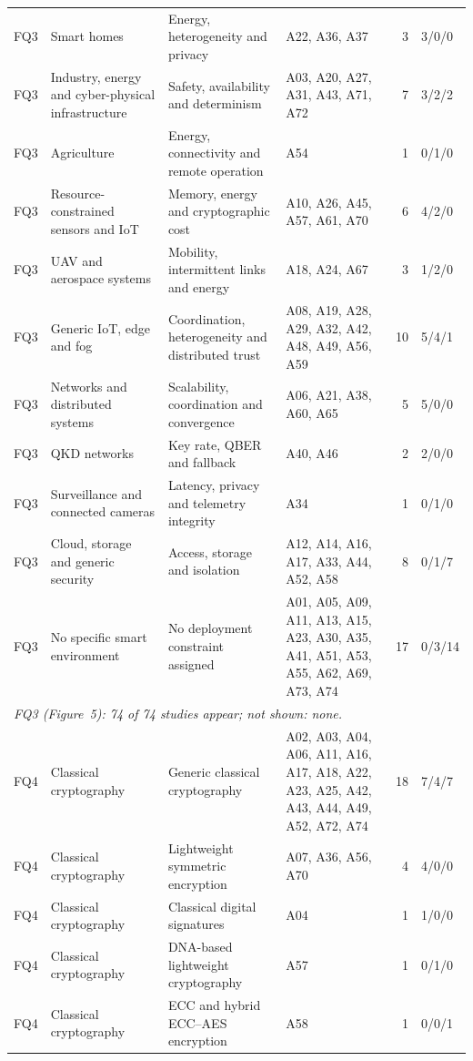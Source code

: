 {\begin{footnotesize}
\begin{longtable}{p{0.63cm}p{2.83cm}p{2.67cm}p{5.19cm}rp{1.26cm}}
FQ3 & Smart homes & Energy, heterogeneity and privacy & A22, A36, A37 & 3 & 3/0/0 \\
FQ3 & Industry, energy and cyber-physical infrastructure & Safety, availability and determinism & A03, A20, A27, A31, A43, A71, A72 & 7 & 3/2/2 \\
FQ3 & Agriculture & Energy, connectivity and remote operation & A54 & 1 & 0/1/0 \\
FQ3 & Resource-constrained sensors and IoT & Memory, energy and cryptographic cost & A10, A26, A45, A57, A61, A70 & 6 & 4/2/0 \\
FQ3 & UAV and aerospace systems & Mobility, intermittent links and energy & A18, A24, A67 & 3 & 1/2/0 \\
FQ3 & Generic IoT, edge and fog & Coordination, heterogeneity and distributed trust & A08, A19, A28, A29, A32, A42, A48, A49, A56, A59 & 10 & 5/4/1 \\
FQ3 & Networks and distributed systems & Scalability, coordination and convergence & A06, A21, A38, A60, A65 & 5 & 5/0/0 \\
FQ3 & QKD networks & Key rate, QBER and fallback & A40, A46 & 2 & 2/0/0 \\
FQ3 & Surveillance and connected cameras & Latency, privacy and telemetry integrity & A34 & 1 & 0/1/0 \\
FQ3 & Cloud, storage and generic security & Access, storage and isolation & A12, A14, A16, A17, A33, A44, A52, A58 & 8 & 0/1/7 \\
FQ3 & No specific smart environment & No deployment constraint assigned & A01, A05, A09, A11, A13, A15, A23, A30, A35, A41, A51, A53, A55, A62, A69, A73, A74 & 17 & 0/3/14 \\
\multicolumn{6}{p{14.2cm}}{\emph{FQ3 (Figure~5): 74 of 74 studies appear; not shown: none.}}\\ \hline
FQ4 & Classical cryptography & Generic classical cryptography & A02, A03, A04, A06, A11, A16, A17, A18, A22, A23, A25, A42, A43, A44, A49, A52, A72, A74 & 18 & 7/4/7 \\
FQ4 & Classical cryptography & Lightweight symmetric encryption & A07, A36, A56, A70 & 4 & 4/0/0 \\
FQ4 & Classical cryptography & Classical digital signatures & A04 & 1 & 1/0/0 \\
FQ4 & Classical cryptography & DNA-based lightweight cryptography & A57 & 1 & 0/1/0 \\
FQ4 & Classical cryptography & ECC and hybrid ECC--AES encryption & A58 & 1 & 0/0/1 \\

\end{longtable}
\end{footnotesize}}
